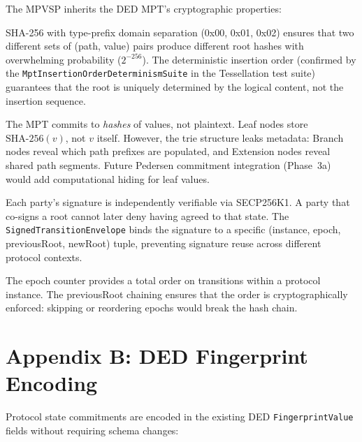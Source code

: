 \documentclass[11pt,a4paper]{article}
\begin{document}
The MPVSP inherits the DED MPT's cryptographic properties:

\begin{description}[leftmargin=2cm, style=nextline]
  \item[Binding]
    SHA-256 with type-prefix domain separation (0x00, 0x01, 0x02) ensures that
    two different sets of (path, value) pairs produce different root hashes
    with overwhelming probability ($2^{-256}$). The deterministic insertion
    order (confirmed by the \texttt{MptInsertionOrderDeterminismSuite} in the
    Tessellation test suite) guarantees that the root is uniquely determined by
    the logical content, not the insertion sequence.

  \item[Hiding]
    The MPT commits to \emph{hashes} of values, not plaintext. Leaf nodes
    store $\text{SHA-256}(v)$, not $v$ itself. However, the trie structure
    leaks metadata: Branch nodes reveal which path prefixes are populated, and
    Extension nodes reveal shared path segments. Future Pedersen commitment
    integration (Phase~3a) would add computational hiding for leaf values.

  \item[Non-Repudiation]
    Each party's signature is independently verifiable via SECP256K1. A party
    that co-signs a root cannot later deny having agreed to that state. The
    \texttt{SignedTransitionEnvelope} binds the signature to a specific
    (instance, epoch, previousRoot, newRoot) tuple, preventing signature
    reuse across different protocol contexts.

  \item[Temporal Ordering]
    The epoch counter provides a total order on transitions within a protocol
    instance. The previousRoot chaining ensures that the order is cryptographically
    enforced: skipping or reordering epochs would break the hash chain.
\end{description}


\section*{Appendix B: DED Fingerprint Encoding}

Protocol state commitments are encoded in the existing DED \texttt{FingerprintValue}
fields without requiring schema changes:
\end{document}
